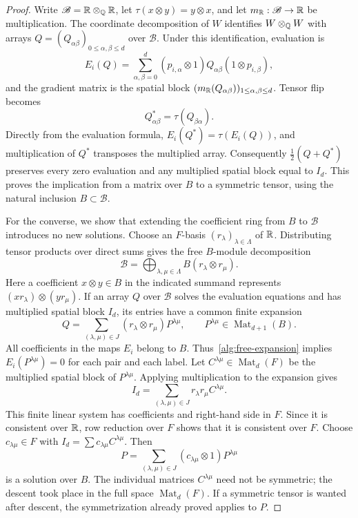 \begin{proof}
Write $\mathscr B=\mathbb R\otimes_{\mathbb Q}\mathbb R$, let
$\tau(x\otimes y)=y\otimes x$, and let
$m_{\mathbb R}:\mathscr B\to\mathbb R$ be multiplication.
The coordinate decomposition of $W$ identifies $W\otimes_{\mathbb Q}W$ with
arrays $Q=(Q_{\alpha\beta})_{0\leq\alpha,\beta\leq d}$ over $\mathscr B$.
Under this identification, evaluation is
\[
 E_i(Q)=\sum_{\alpha,\beta=0}^d
 (p_{i,\alpha}\otimes1)Q_{\alpha\beta}
 (1\otimes p_{i,\beta}),
\]
and the gradient matrix is the spatial block
$(m_{\mathbb R}(Q_{\alpha\beta}))_{1\leq\alpha,\beta\leq d}$.
Tensor flip becomes
\[
 Q^*_{\alpha\beta}=\tau(Q_{\beta\alpha}).
\]
Directly from the evaluation formula,
$E_i(Q^*)=\tau(E_i(Q))$, and multiplication of $Q^*$ transposes the
multiplied array.  Consequently $\tfrac12(Q+Q^*)$ preserves every zero
evaluation and any multiplied spatial block equal to $I_d$.
This proves the implication from a matrix over $B$ to a symmetric tensor,
using the natural inclusion $B\subset\mathscr B$.

For the converse, we show that extending the coefficient ring from $B$
to $\mathscr B$ introduces no new solutions.  Choose an $F$-basis
$(r_\lambda)_{\lambda\in\Lambda}$ of $\mathbb R$.  Distributing tensor products
over direct sums gives the free $B$-module decomposition
\begin{equation}\label{alg:free-expansion}
 \mathscr B=
 \bigoplus_{\lambda,\mu\in\Lambda}
 B(r_\lambda\otimes r_\mu).
\end{equation}
Here a coefficient $x\otimes y\in B$ in the indicated summand represents
$(xr_\lambda)\otimes(yr_\mu)$.
If an array $Q$ over $\mathscr B$ solves the evaluation equations and has
multiplied spatial block $I_d$, its entries have a common finite expansion
\[
 Q=\sum_{(\lambda,\mu)\in J}
 (r_\lambda\otimes r_\mu)P^{\lambda\mu},
 \qquad P^{\lambda\mu}\in\operatorname{Mat}_{d+1}(B).
\]
All coefficients in the maps $E_i$ belong to $B$.
Thus~\eqref{alg:free-expansion} implies
$E_i(P^{\lambda\mu})=0$ for each pair and each label.
Let $C^{\lambda\mu}\in\operatorname{Mat}_d(F)$ be the multiplied spatial
block of $P^{\lambda\mu}$.  Applying multiplication to the expansion gives
\[
 I_d=\sum_{(\lambda,\mu)\in J}
 r_\lambda r_\mu C^{\lambda\mu}.
\]
This finite linear system has coefficients and right-hand side in $F$.
Since it is consistent over $\mathbb R$, row reduction over $F$ shows that it
is consistent over $F$.  Choose $c_{\lambda\mu}\in F$ with
$I_d=\sum c_{\lambda\mu}C^{\lambda\mu}$.  Then
\[
 P=\sum_{(\lambda,\mu)\in J}
 (c_{\lambda\mu}\otimes1)P^{\lambda\mu}
\]
is a solution over $B$.  The individual matrices $C^{\lambda\mu}$ need
not be symmetric; the descent took place in the full space
$\operatorname{Mat}_d(F)$.  If a symmetric tensor is wanted after descent,
the symmetrization already proved applies to $P$.
\end{proof}

